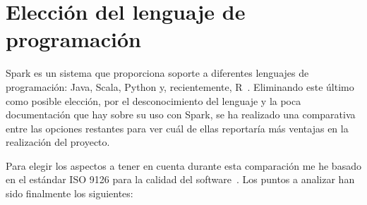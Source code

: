 


\section{Elección del lenguaje de programación}\label{EleccionLenguaje}

Spark es un sistema que proporciona soporte a diferentes lenguajes de programación: Java, Scala, Python y, recientemente, R~\cite{SparkDoc}. Eliminando este último como posible elección, por el desconocimiento del lenguaje y la poca documentación que hay sobre su uso con Spark, se ha realizado una comparativa entre las opciones restantes para ver cuál de ellas reportaría más ventajas en la realización del proyecto.

Para elegir los aspectos a tener en cuenta durante esta comparación me he basado en el estándar ISO 9126 para la calidad del software~\cite{ISO9126}. Los puntos a analizar han sido finalmente los siguientes: \\

